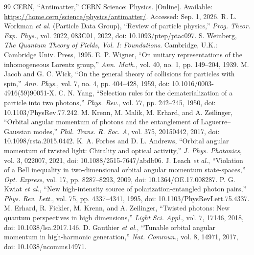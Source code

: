 \documentclass[conference]{../../../../Conference-LaTeX-template_10-17-19/IEEEtran}
\begin{document}
\begin{thebibliography}{99}
 CERN, ``Antimatter,'' CERN Science: Physics. [Online]. Available: \url{https://home.cern/science/physics/antimatter/}. Accessed: Sep. 1, 2026.
 R. L. Workman \emph{et al.} (Particle Data Group), ``Review of particle physics,'' \emph{Prog. Theor. Exp. Phys.}, vol. 2022, 083C01, 2022, doi: 10.1093/ptep/ptac097.
 S. Weinberg, \emph{The Quantum Theory of Fields, Vol. I: Foundations}. Cambridge, U.K.: Cambridge Univ. Press, 1995.
 E. P. Wigner, ``On unitary representations of the inhomogeneous Lorentz group,'' \emph{Ann. Math.}, vol. 40, no. 1, pp. 149--204, 1939.
 M. Jacob and G. C. Wick, ``On the general theory of collisions for particles with spin,'' \emph{Ann. Phys.}, vol. 7, no. 4, pp. 404--428, 1959, doi: 10.1016/0003-4916(59)90051-X.
 C. N. Yang, ``Selection rules for the dematerialization of a particle into two photons,'' \emph{Phys. Rev.}, vol. 77, pp. 242--245, 1950, doi: 10.1103/PhysRev.77.242.
 M. Krenn, M. Malik, M. Erhard, and A. Zeilinger, ``Orbital angular momentum of photons and the entanglement of Laguerre--Gaussian modes,'' \emph{Phil. Trans. R. Soc. A}, vol. 375, 20150442, 2017, doi: 10.1098/rsta.2015.0442.
 K. A. Forbes and D. L. Andrews, ``Orbital angular momentum of twisted light: Chirality and optical activity,'' \emph{J. Phys. Photonics}, vol. 3, 022007, 2021, doi: 10.1088/2515-7647/abdb06.
 J. Leach \emph{et al.}, ``Violation of a Bell inequality in two-dimensional orbital angular momentum state-spaces,'' \emph{Opt. Express}, vol. 17, pp. 8287--8293, 2009, doi: 10.1364/OE.17.008287.
 P. G. Kwiat \emph{et al.}, ``New high-intensity source of polarization-entangled photon pairs,'' \emph{Phys. Rev. Lett.}, vol. 75, pp. 4337--4341, 1995, doi: 10.1103/PhysRevLett.75.4337.
 M. Erhard, R. Fickler, M. Krenn, and A. Zeilinger, ``Twisted photons: New quantum perspectives in high dimensions,'' \emph{Light Sci. Appl.}, vol. 7, 17146, 2018, doi: 10.1038/lsa.2017.146.
 D. Gauthier \emph{et al.}, ``Tunable orbital angular momentum in high-harmonic generation,'' \emph{Nat. Commun.}, vol. 8, 14971, 2017, doi: 10.1038/ncomms14971.
\end{thebibliography}
\end{document}
